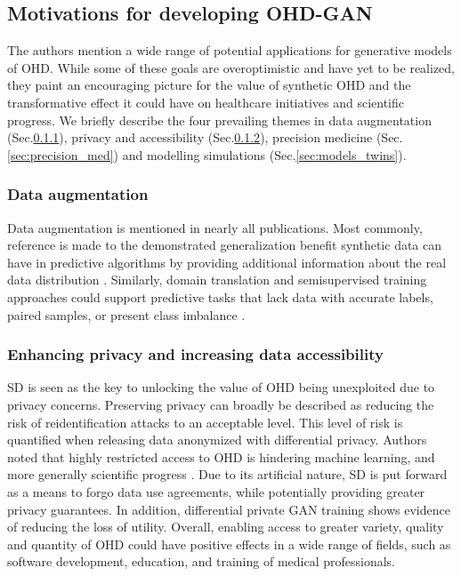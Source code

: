 \subsection{Motivations for developing OHD-GAN}
The authors mention a wide range of potential applications for generative models of OHD. While some of these goals are overoptimistic and have yet to be realized, they paint an encouraging picture for the value of synthetic OHD and the transformative effect it could have on healthcare initiatives and scientific progress. We briefly describe the four prevailing themes in data augmentation (Sec.\ref{sec:augmentation}), privacy and accessibility (Sec.\ref{sec:access_privacy}), precision medicine (Sec.\ref{sec:precision_med}) and  modelling simulations (Sec.\ref{sec:models_twins}). 

    \subsubsection{Data augmentation}\label{sec:augmentation}
    Data augmentation is mentioned in nearly all publications. Most commonly, reference is made to the demonstrated generalization benefit synthetic data can have in predictive algorithms by providing additional information about the real data distribution \cite{Wang_2019,Che_2017,Yoon2018-dm, Yoon2018-mo}. Similarly, domain translation and semisupervised training approaches could support predictive tasks that lack data with accurate labels, paired samples, or present class imbalance \cite{Che_2017,mcdermott2018semi}. 

    \subsubsection{Enhancing privacy and increasing data accessibility}\label{sec:access_privacy}
    SD is seen as the key to unlocking the value of OHD being unexploited due to privacy concerns. Preserving privacy can broadly be described as reducing the risk of reidentification attacks to an acceptable level. This level of risk is quantified when releasing data anonymized with differential privacy. Authors noted that highly restricted access to OHD is hindering machine learning, and more generally scientific progress \cite{Beaulieu-Jones2019-ct, Baowaly_2019,Che_2017,esteban2017real,Fisher2019}. Due to its artificial nature, SD is put forward as a means to forgo data use agreements, while potentially providing greater privacy guarantees\cite{Beaulieu-Jones2019-ct, Baowaly_2019,esteban2017real,Fisher2019,walsh2020generating}. In addition, differential private GAN training shows evidence of reducing the loss of utility. \todo Overall, enabling access to greater variety, quality and quantity of OHD could have positive effects in a wide range of fields, such as software development, education, and training of medical professionals. 
    
